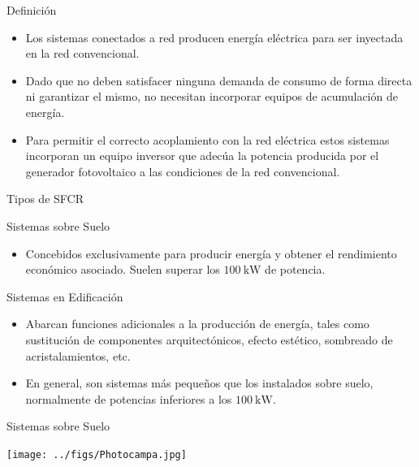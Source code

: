 \documentclass[xcolor={usenames,svgnames,dvipsnames}]{beamer}
\begin{document}
\begin{frame}[label={sec:orgd7bf967}]{Definición}
\begin{itemize}
\item Los sistemas conectados a red producen energía eléctrica para ser
\alert{inyectada en la red convencional}.

\item Dado que no deben satisfacer ninguna demanda de consumo de forma
directa ni garantizar el mismo, \alert{no necesitan incorporar equipos de
acumulación de energía}.

\item Para permitir el correcto acoplamiento con la red eléctrica estos
sistemas \alert{incorporan un equipo inversor} que adecúa la potencia
producida por el generador fotovoltaico a las condiciones de la red
convencional.
\end{itemize}
\end{frame}

\begin{frame}[label={sec:org21de731}]{Tipos de SFCR}
\begin{block}{Sistemas sobre Suelo}
\begin{itemize}
\item Concebidos exclusivamente para producir energía y obtener el
rendimiento económico asociado. Suelen superar los
\(\SI{100}{\kilo\watt}\) de potencia.
\end{itemize}
\end{block}

\begin{block}{Sistemas en Edificación}
\begin{itemize}
\item Abarcan funciones adicionales a la producción de energía, tales como
sustitución de componentes arquitectónicos, efecto estético,
sombreado de acristalamientos, etc.

\item En general, son sistemas más pequeños que los instalados sobre
suelo, normalmente de potencias inferiores a los
\(\SI{100}{\kilo\watt}\).
\end{itemize}
\end{block}
\end{frame}

\begin{frame}[label={sec:org652c636}]{Sistemas sobre Suelo}
\begin{center}
\texttt{[image: ../figs/Photocampa.jpg]}
\end{center}
\end{frame}
\end{document}
